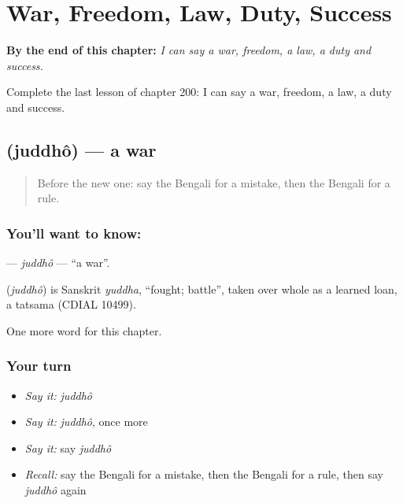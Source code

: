 
\chapter{War, Freedom, Law, Duty, Success}
\label{ch:bn-war-freedom-law-duty-success}

\begin{chapteropening}
\textbf{By the end of this chapter:} \emph{I can say a war, freedom, a law, a duty and success.}

Complete the last lesson of chapter 200: I can say a war, freedom, a law, a duty and success.
\end{chapteropening}

\section[\texorpdfstring{\bn{যুদ্ধ} (juddhô)}{যুদ্ধ (juddhô)}]{ (juddhô) — a war}

\label{lesson:BN-C200-juddho}



\begin{quote}
Before the new one: say the Bengali for a mistake, then the Bengali for a rule.
\end{quote}

\subsection*{You'll want to know: }
\textbf{} — \emph{juddhô} — \textquotedblleft{}a war\textquotedblright{}.

\begin{cousinweb}
\textbf{} (\emph{juddhô}) is Sanskrit \emph{yuddha}, \textquotedblleft{}fought; battle\textquotedblright{}, taken over whole as a learned loan, a tatsama (CDIAL 10499).
\end{cousinweb}

\begin{grammarlens}[title={What you've built}]
One more word for this chapter.
\end{grammarlens}

\subsection*{Your turn}
\begin{itemize}
\raggedright
  \item \emph{Say it:} \emph{juddhô}
  \item \emph{Say it:} \emph{juddhô}, once more
  \item \emph{Say it:} say \emph{juddhô}
  \item \emph{Recall:} say the Bengali for a mistake, then the Bengali for a rule, then say \emph{juddhô} again
\end{itemize}

